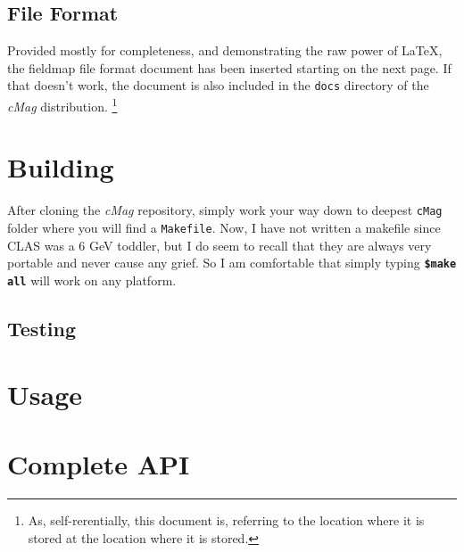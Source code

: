 \documentclass{article}
\begin{document}
\subsection {File Format}
Provided mostly for completeness, and demonstrating the raw power of \LaTeX, the fieldmap file format document has been inserted starting on the next page. If that doesn't work, the document is also included in the  \texttt{docs} directory of the \textit{cMag} distribution. \footnote{ As, self-rerentially, this document is, referring to the location where it is stored at the location where it is stored.}


\section {Building}
After cloning the \textit{cMag} repository, simply work your way down to deepest \texttt{cMag} folder where you will find a \texttt{Makefile}. Now, I have not written a makefile since CLAS was a 6 GeV toddler, but I do seem to recall that they are always very portable and never cause any grief. So I am comfortable that simply typing
\newline
\newline
\textbf{\texttt{\$make all}}
\newline
\newline
will work on any platform. 
\subsection {Testing}
\section {Usage}

\section{Complete API}
\end{document}
